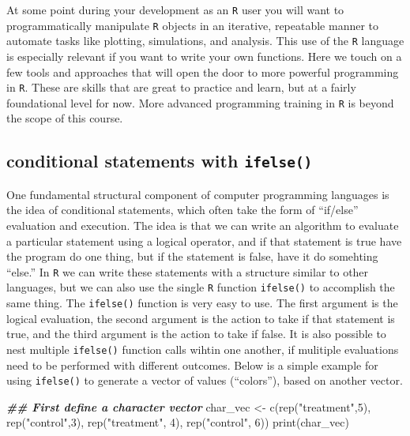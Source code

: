 \documentclass[
]{book}
\newenvironment{Shaded}{\begin{snugshade}}{\end{snugshade}}
\newcommand{\DecValTok}[1]{\textcolor[rgb]{0.00,0.00,0.81}{#1}}
\newcommand{\DocumentationTok}[1]{\textcolor[rgb]{0.56,0.35,0.01}{\textbf{\textit{#1}}}}
\newcommand{\FunctionTok}[1]{\textcolor[rgb]{0.00,0.00,0.00}{#1}}
\newcommand{\NormalTok}[1]{#1}
\newcommand{\OtherTok}[1]{\textcolor[rgb]{0.56,0.35,0.01}{#1}}
\newcommand{\StringTok}[1]{\textcolor[rgb]{0.31,0.60,0.02}{#1}}
\begin{document}
At some point during your development as an \texttt{R} user you will want to programmatically manipulate \texttt{R} objects in an iterative, repeatable manner to automate tasks like plotting, simulations, and analysis. This use of the \texttt{R} language is especially relevant if you want to write your own functions. Here we touch on a few tools and approaches that will open the door to more powerful programming in \texttt{R}. These are skills that are great to practice and learn, but at a fairly foundational level for now. More advanced programming training in \texttt{R} is beyond the scope of this course.

\hypertarget{conditional-statements-with-ifelse}{%
\subsection{\texorpdfstring{conditional statements with \texttt{ifelse()}}{conditional statements with ifelse()}}\label{conditional-statements-with-ifelse}}

One fundamental structural component of computer programming languages is the idea of conditional statements, which often take the form of ``if/else'' evaluation and execution. The idea is that we can write an algorithm to evaluate a particular statement using a logical operator, and if that statement is true have the program do one thing, but if the statement is false, have it do somehting ``else.'' In \texttt{R} we can write these statements with a structure similar to other languages, but we can also use the single \texttt{R} function \texttt{ifelse()} to accomplish the same thing. The \texttt{ifelse()} function is very easy to use. The first argument is the logical evaluation, the second argument is the action to take if that statement is true, and the third argument is the action to take if false. It is also possible to nest multiple \texttt{ifelse()} function calls wihtin one another, if mulitiple evaluations need to be performed with different outcomes. Below is a simple example for using \texttt{ifelse()} to generate a vector of values (``colors''), based on another vector.

\begin{Shaded}
\begin{Highlighting}[]
\DocumentationTok{\#\# First define a character vector}
\NormalTok{char\_vec }\OtherTok{\textless{}{-}} \FunctionTok{c}\NormalTok{(}\FunctionTok{rep}\NormalTok{(}\StringTok{"treatment"}\NormalTok{,}\DecValTok{5}\NormalTok{), }\FunctionTok{rep}\NormalTok{(}\StringTok{"control"}\NormalTok{,}\DecValTok{3}\NormalTok{), }\FunctionTok{rep}\NormalTok{(}\StringTok{"treatment"}\NormalTok{, }\DecValTok{4}\NormalTok{), }\FunctionTok{rep}\NormalTok{(}\StringTok{"control"}\NormalTok{, }\DecValTok{6}\NormalTok{))}
\FunctionTok{print}\NormalTok{(char\_vec)}
\end{Highlighting}
\end{Shaded}
\end{document}
